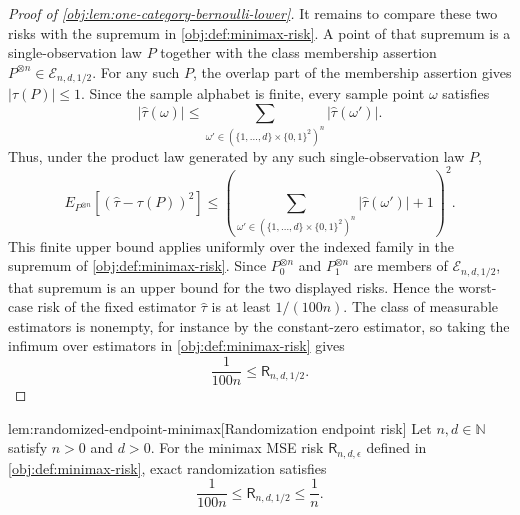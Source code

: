 \documentclass[11pt]{article}
\begin{document}
\begin{proof}[Proof of \cref{obj:lem:one-category-bernoulli-lower}]
It remains to compare these two risks with the supremum in \cref{obj:def:minimax-risk}. A point of that supremum is a single-observation law \(P\) together with the class membership assertion \(P^{\otimes n}\in\mathcal E_{n,d,1/2}\). For any such \(P\), the overlap part of the membership assertion gives \(|\tau(P)|\le1\). Since the sample alphabet is finite, every sample point \(\omega\) satisfies
\[
|\widehat\tau(\omega)|
\le
\sum_{\omega'\in(\{1,
\ldots,d\}\times\{0,1\}^2)^n}|\widehat\tau(\omega')| .
\]
Thus, under the product law generated by any such single-observation law \(P\),
\[
E_{P^{\otimes n}}\!\left[(\widehat\tau-\tau(P))^2\right]
\le
\left(
\sum_{\omega'\in(\{1,\ldots,d\}\times\{0,1\}^2)^n}|\widehat\tau(\omega')|+1
\right)^2 .
\]
This finite upper bound applies uniformly over the indexed family in the supremum of \cref{obj:def:minimax-risk}. Since \(P_0^{\otimes n}\) and \(P_1^{\otimes n}\) are members of \(\mathcal E_{n,d,1/2}\), that supremum is an upper bound for the two displayed risks. Hence the worst-case risk of the fixed estimator \(\widehat\tau\) is at least \(1/(100n)\). The class of measurable estimators is nonempty, for instance by the constant-zero estimator, so taking the infimum over estimators in \cref{obj:def:minimax-risk} gives
\[
\frac1{100n}\le \mathsf R_{n,d,1/2}.
\]
\end{proof}

\begin{lemmav}{lem:randomized-endpoint-minimax}[Randomization endpoint risk]
Let \(n,d\in\mathbb N\) satisfy \(n>0\) and \(d>0\). For the minimax MSE risk \(\mathsf R_{n,d,\epsilon}\) defined in \cref{obj:def:minimax-risk}, exact randomization satisfies
\[
\frac{1}{100n}\le \mathsf R_{n,d,1/2}\le \frac{1}{n}.
\]
\end{lemmav}
\end{document}
